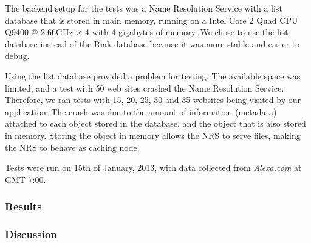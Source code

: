 The backend setup for the tests was a Name Resolution Service with a list database that is stored in main memory, running on a Intel Core 2 Quad CPU Q9400 @ 2.66GHz × 4 with 4 gigabytes of memory. We chose to use the list database instead of the Riak database because it was more stable and easier to debug.

Using the list database provided a problem for testing. The available space was limited, and a test with 50 web sites crashed the Name Resolution Service. Therefore, we ran tests with 15, 20, 25, 30 and 35 websites being visited by our application. The crash was due to the amount of information (metadata) attached to each object stored in the database, and the object that is also stored in memory. Storing the object in memory allows the NRS to serve files, making the NRS to behave as caching node.

Tests were run on 15th of January, 2013, with data collected from \textit{Alexa.com} at GMT 7:00.

\subsubsection{Results}



\subsubsection{Discussion}
